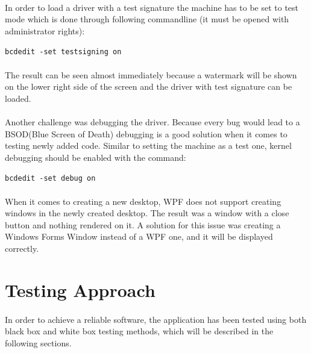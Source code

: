 		\paragraph{}
		In order to load a driver with a test signature the machine has to be set to test mode which is done through following commandline (it must be opened with administrator rights):
		
		\bigskip
		\centerline {\texttt{bcdedit -set testsigning on}}
		\bigskip
		
		\paragraph{}
		The result can be seen almost immediately because a watermark will be shown on the lower right side of the screen and the driver with test signature can be loaded.
		
		\paragraph{}
		Another challenge was debugging the driver. Because every bug would lead to a BSOD(Blue Screen of Death) debugging is a good solution when it comes to testing newly added code. Similar to setting the machine as a test one, kernel debugging should be enabled with the command:
		
		\bigskip
		\centerline {\texttt{bcdedit -set debug on}}
		\bigskip
		
		\paragraph{}
		 When it comes to creating a new desktop, WPF does not support creating windows in the newly created desktop. The result was a window with a close button and nothing rendered on it. A solution for this issue was creating a Windows Forms Window instead of a WPF one, and it will be displayed correctly.
		
	\newpage
	\section{Testing Approach}
		\paragraph{}
		In order to achieve a reliable software, the application has been tested using both black box and white box testing methods, which will be described in the following sections.
		
